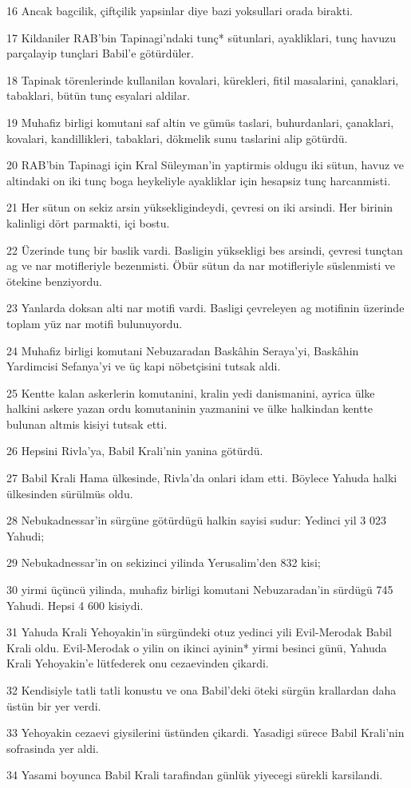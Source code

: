 \par 16 Ancak bagcilik, çiftçilik yapsinlar diye bazi yoksullari orada birakti.
\par 17 Kildaniler RAB'bin Tapinagi'ndaki tunç* sütunlari, ayakliklari, tunç havuzu parçalayip tunçlari Babil'e götürdüler.
\par 18 Tapinak törenlerinde kullanilan kovalari, kürekleri, fitil masalarini, çanaklari, tabaklari, bütün tunç esyalari aldilar.
\par 19 Muhafiz birligi komutani saf altin ve gümüs taslari, buhurdanlari, çanaklari, kovalari, kandillikleri, tabaklari, dökmelik sunu taslarini alip götürdü.
\par 20 RAB'bin Tapinagi için Kral Süleyman'in yaptirmis oldugu iki sütun, havuz ve altindaki on iki tunç boga heykeliyle ayakliklar için hesapsiz tunç harcanmisti.
\par 21 Her sütun on sekiz arsin yüksekligindeydi, çevresi on iki arsindi. Her birinin kalinligi dört parmakti, içi bostu.
\par 22 Üzerinde tunç bir baslik vardi. Basligin yüksekligi bes arsindi, çevresi tunçtan ag ve nar motifleriyle bezenmisti. Öbür sütun da nar motifleriyle süslenmisti ve ötekine benziyordu.
\par 23 Yanlarda doksan alti nar motifi vardi. Basligi çevreleyen ag motifinin üzerinde toplam yüz nar motifi bulunuyordu.
\par 24 Muhafiz birligi komutani Nebuzaradan Baskâhin Seraya'yi, Baskâhin Yardimcisi Sefanya'yi ve üç kapi nöbetçisini tutsak aldi.
\par 25 Kentte kalan askerlerin komutanini, kralin yedi danismanini, ayrica ülke halkini askere yazan ordu komutaninin yazmanini ve ülke halkindan kentte bulunan altmis kisiyi tutsak etti.
\par 26 Hepsini Rivla'ya, Babil Krali'nin yanina götürdü.
\par 27 Babil Krali Hama ülkesinde, Rivla'da onlari idam etti. Böylece Yahuda halki ülkesinden sürülmüs oldu.
\par 28 Nebukadnessar'in sürgüne götürdügü halkin sayisi sudur: Yedinci yil 3 023 Yahudi;
\par 29 Nebukadnessar'in on sekizinci yilinda Yerusalim'den 832 kisi;
\par 30 yirmi üçüncü yilinda, muhafiz birligi komutani Nebuzaradan'in sürdügü 745 Yahudi. Hepsi 4 600 kisiydi.
\par 31 Yahuda Krali Yehoyakin'in sürgündeki otuz yedinci yili Evil-Merodak Babil Krali oldu. Evil-Merodak o yilin on ikinci ayinin* yirmi besinci günü, Yahuda Krali Yehoyakin'e lütfederek onu cezaevinden çikardi.
\par 32 Kendisiyle tatli tatli konustu ve ona Babil'deki öteki sürgün krallardan daha üstün bir yer verdi.
\par 33 Yehoyakin cezaevi giysilerini üstünden çikardi. Yasadigi sürece Babil Krali'nin sofrasinda yer aldi.
\par 34 Yasami boyunca Babil Krali tarafindan günlük yiyecegi sürekli karsilandi.


